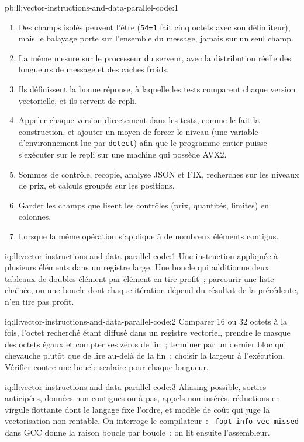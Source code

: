 \begin{solution}{pb:ll:vector-instructions-and-data-parallel-code:1}
\begin{enumerate}
\item Des champs isolés peuvent l'être (\texttt{54=1} fait cinq octets avec son délimiteur), mais le balayage porte sur l'ensemble du message, jamais
sur un seul champ.
\item La même mesure sur le processeur du serveur, avec la distribution réelle des longueurs de message et des caches froids.
\item Ils définissent la bonne réponse, à laquelle les tests comparent chaque version vectorielle, et ils servent de repli.
\item Appeler chaque version directement dans les tests, comme le fait la construction, et ajouter un moyen de forcer le niveau (une variable d'environnement
lue par \texttt{detect}) afin que le programme entier puisse s'exécuter sur le repli sur une machine qui possède AVX2.
\item Sommes de contrôle, recopie, analyse JSON et FIX, recherches sur les niveaux de prix, et calculs groupés sur les positions.
\item Garder les champs que lisent les contrôles (prix, quantités, limites) en colonnes.
\item Lorsque la même opération s'applique à de nombreux éléments contigus.
\end{enumerate}
\end{solution}

\begin{solution}{iq:ll:vector-instructions-and-data-parallel-code:1}
Une instruction appliquée à plusieurs éléments dans un registre large. Une boucle qui additionne deux tableaux de doubles élément par élément en tire profit~;
parcourir une liste chaînée, ou une boucle dont chaque itération dépend du résultat de la précédente, n'en tire pas profit.
\end{solution}

\begin{solution}{iq:ll:vector-instructions-and-data-parallel-code:2}
Comparer 16 ou 32 octets à la fois, l'octet recherché étant diffusé dans un registre vectoriel, prendre le masque des octets égaux et compter ses zéros de fin~;
terminer par un dernier bloc qui chevauche plutôt que de lire au-delà de la fin~; choisir la largeur à l'exécution.
Vérifier contre une boucle scalaire pour chaque longueur.
\end{solution}

\begin{solution}{iq:ll:vector-instructions-and-data-parallel-code:3}
Aliasing possible, sorties anticipées, données non contiguës ou à pas, appels non insérés, réductions en virgule flottante dont le langage fixe l'ordre,
et modèle de coût qui juge la vectorisation non rentable. On interroge le compilateur~: \texttt{-fopt-info-vec-missed} dans GCC donne la raison boucle par boucle~;
on lit ensuite l'assembleur.
\end{solution}

